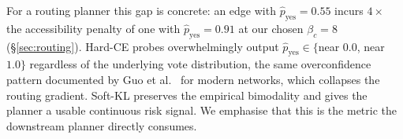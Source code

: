 \documentclass[conference]{IEEEtran}
\begin{document}
\begin{table}[!t]
\caption{\textbf{Headline calibration result.} Soft Brier ($\downarrow$, lower = better calibrated against the human vote distribution). 5-fold CV; $\pm$ is 95\% CI over the 40 (fold, aid) measurements per encoder. \textbf{Bold}: best within its column. The Soft-KL/Hard-CE gap is consistent across all eight encoders.}
\label{tab:calibration_headline}
\centering\small
\setlength{\tabcolsep}{4pt}
\end{table}

For a routing planner this gap is concrete: an edge with $\hat{p}_\mathrm{yes}=0.55$ incurs $4\times$ the accessibility penalty of one with $\hat{p}_\mathrm{yes}=0.91$ at our chosen $\beta_c=8$ (\S\ref{sec:routing}). Hard-CE probes overwhelmingly output $\hat{p}_\mathrm{yes}\in\{$near $0.0$, near $1.0\}$ regardless of the underlying vote distribution, the same overconfidence pattern documented by Guo et al.~\cite{guo2017calibration} for modern networks, which collapses the routing gradient. Soft-KL preserves the empirical bimodality and gives the planner a usable continuous risk signal. We emphasise that this is the metric the downstream planner directly consumes.
\end{document}
